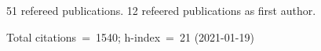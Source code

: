 51 refereed publications. 12 refeered publications as first author.

Total citations~=~1540; h-index~=~21 (2021-01-19)